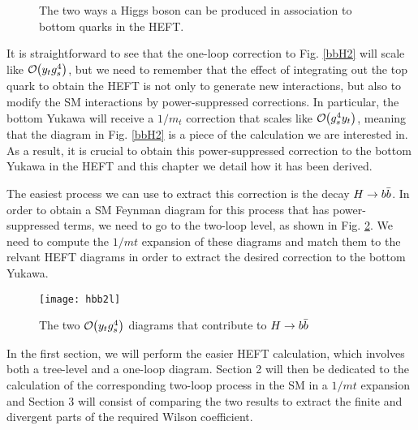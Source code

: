 \begin{figure}[!h]
  \centering
  \hspace{2em}
  \caption[$pp\to H \bbbar$]{The two ways a Higgs boson can be produced in association to bottom quarks in the HEFT.}
  \label{bbHdiags}
\end{figure}

It is straightforward to see that the one-loop correction to Fig. \ref{bbH2} will scale like ${\cal O}\hspace{-0.2em}\left(y_t g_s^4\right)$, but we need to remember that the effect of integrating out the top quark to obtain the HEFT is not only to generate new interactions, but also to modify the SM interactions by power-suppressed corrections. In particular, the bottom Yukawa will receive a $1/m_t$ correction that scales like ${\cal O}\hspace{-0.2em}\left(g_s^4 y_t \right)$, meaning that the diagram in Fig. \ref{bbH2} is a piece of the calculation we are interested in. As a result, it is crucial to obtain this power-suppressed correction to the bottom Yukawa in the HEFT and this chapter we detail how it has been derived.

The easiest process we can use to extract this correction is the decay $H\to \bbbar$. In order to obtain a SM Feynman diagram for this process that has power-suppressed terms, we need to go to the two-loop level, as shown in Fig. \ref{hbb2l}. We need to compute the $1/mt$ expansion of these diagrams and match them to the relvant HEFT diagrams in order to extract the desired correction to the bottom Yukawa.

\begin{figure}[!h]
  \centering
  \texttt{[image: hbb2l]}
  \caption[$H\to \bbbar$ at two loops in the SM]{The two ${\cal O}\hspace{-0.2em}\left(y_t g_s^4\right)$ diagrams that contribute to $H\to \bbbar$}
  \label{hbb2l}
\end{figure}

In the first section, we will perform the easier HEFT calculation, which involves both a tree-level and a one-loop diagram. Section 2 will then be dedicated to the calculation of the corresponding two-loop process in the SM in a $1/mt$ expansion and Section 3 will consist of comparing the two results to extract the finite and divergent parts of the required Wilson coefficient.
